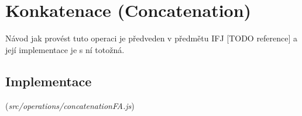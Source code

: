 \section{Konkatenace (Concatenation)}\label{sec:impConc}
Návod jak provést tuto operaci je předveden v předmětu IFJ [TODO reference] a její implementace je s ní totožná.
\subsection{Implementace}
(\textit{src/operations/concatenationFA.js})